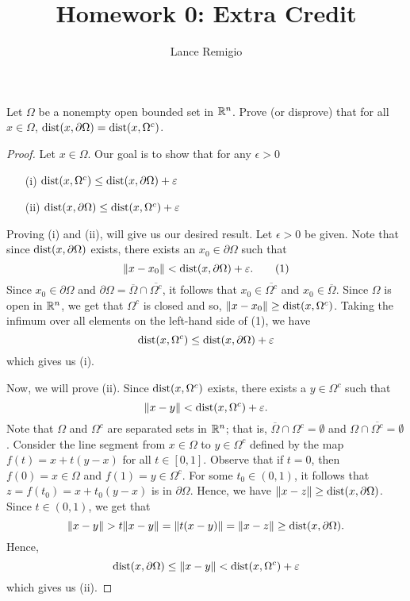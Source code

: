 \documentclass[a4paper]{article}
\title{Homework 0: Extra Credit}
\author{Lance Remigio}
\begin{document}
\maketitle

\begin{problem}
    Let \( \Omega \) be a nonempty open bounded set in \( \mathbb{R}^{n} \). Prove (or disprove) that for all \( x \in \Omega \), \( \text{dist}(x, \partial \Omega) = \operatorname{dist} (x , \Omega^{c}) \). 
\end{problem}
\begin{proof}
    Let \( x \in \Omega \). Our goal is to show that for any \( \epsilon > 0  \)
    \begin{enumerate}
        \item[(i)]  \( \operatorname{dist}(x,  \Omega^{c}) \leq \operatorname{dist}(x, \partial \Omega) + \varepsilon \)
        \item[(ii)] \( \operatorname{dist}(x, \partial \Omega) \leq \operatorname{dist}(x, \Omega^{c}) + \varepsilon \) 
    \end{enumerate}
    Proving (i) and (ii), will give us our desired result.
    Let \( \epsilon > 0  \) be given. Note that since \( \operatorname{dist}(x, \partial \Omega )\) exists, there exists an \( {x}_{0} \in \partial \Omega \) such that  
    \[  \|x - {x}_{0}\| < \operatorname{dist}(x, \partial \Omega) + \varepsilon. \tag{1} \]
    Since \( {x}_{0} \in \partial \Omega \) and \( \partial \Omega = \overline{\Omega} \cap \overline{\Omega^{c}} \), it follows that \( {x}_{0} \in \overline{ \Omega^{c} }  \) and \( {x}_{0} \in \overline{\Omega} \). Since \( \Omega \) is open in \( \mathbb{R}^{n} \), we get that \( \Omega^{c} \) is closed and so, \( \|x - {x}_{0}\| \geq \operatorname{dist}(x, \Omega^{c})  \). Taking the infimum over all elements on the left-hand side of (1), we have 
    \[ \operatorname{dist}(x, \Omega^{c}) \leq \operatorname{dist}(x, \partial \Omega) + \varepsilon  \]
    which gives us (i).

    Now, we will prove (ii). Since \( \operatorname{dist}(x, \Omega^{c})  \) exists, there exists a \( y \in \Omega^{c} \) such that    
    \[  \|x - y  \| < \operatorname{dist}(x, \Omega^{c}) + \varepsilon. \]
    Note that \( \Omega  \) and \(  \Omega^{c} \) are separated sets in \( \mathbb{R}^{n} \); that is, \( \overline{\Omega} \cap \Omega^{c} = \emptyset \) and \( \Omega \cap \overline{\Omega^{c}} = \emptyset \). Consider the line segment from \( x \in \Omega \) to \( y \in \Omega^{c} \) defined by the map \( f(t) = x + t(y-x)  \) for all \( t \in [0,1] \). Observe that if \( t = 0  \), then \( f(0) = x \in \Omega \) and \( f(1) = y \in \Omega^{c} \). For some \( {t}_{0} \in (0,1) \), it follows that \( z = f({t}_{0}) = x + {t}_{0} (y-x) \) is in \( \partial \Omega \).
    Hence, we have \( \|x - z \| \geq \operatorname{dist}(x, \partial \Omega) \). Since \( t \in (0,1) \), we get that
    \[  \|x - y \| > t \| x - y \| = \|t (x-y)\| = \|x - z \| \geq \operatorname{dist}(x, \partial \Omega). \]
    Hence, 
    \[  \operatorname{dist}(x, \partial \Omega ) \leq \|x - y \| < \operatorname{dist}(x, \Omega^{c}) + \varepsilon  \]
    which gives us (ii).
\end{proof}
\end{document}
